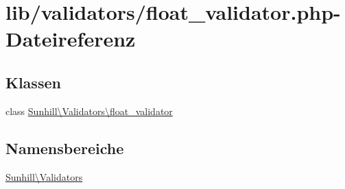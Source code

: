 \hypertarget{float__validator_8php}{}\section{lib/validators/float\+\_\+validator.php-\/\+Dateireferenz}
\label{float__validator_8php}
\subsection*{Klassen}
\begin{DoxyCompactItemize}
\item 
class \hyperlink{classSunhill_1_1Validators_1_1float__validator}{Sunhill\textbackslash{}\+Validators\textbackslash{}float\+\_\+validator}
\end{DoxyCompactItemize}
\subsection*{Namensbereiche}
\begin{DoxyCompactItemize}
\item 
 \hyperlink{namespaceSunhill_1_1Validators}{Sunhill\textbackslash{}\+Validators}
\end{DoxyCompactItemize}
